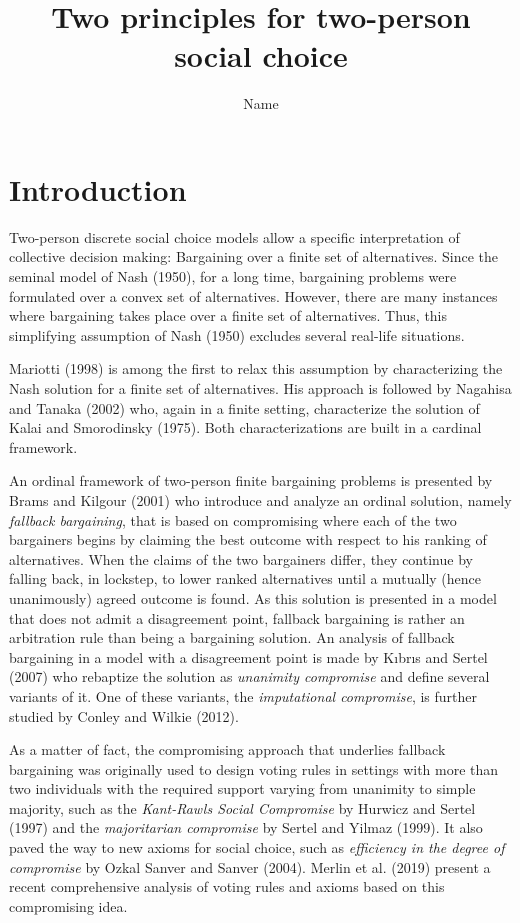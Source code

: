 \documentclass[version=3.21, pagesize, twoside=off, bibliography=totoc, DIV=calc, fontsize=12pt, a4paper]{scrartcl}
\title{Two principles for two-person social choice}
\author{Name}
\affil{Université Paris-Dauphine, PSL Research University, CNRS, LAMSADE, 75016 PARIS, FRANCE\\
}
\begin{document}
\maketitle

\section{Introduction}
\label{sec:intro}


Two-person discrete social choice models allow a specific interpretation of collective decision making: Bargaining over a finite set of alternatives. Since the seminal model of Nash (1950), for a long time, bargaining problems were formulated over a convex set of alternatives. However, there are many instances where bargaining takes place over a finite set of alternatives. Thus, this simplifying assumption of Nash (1950) excludes several real-life situations. 

Mariotti (1998) is among the first to relax this assumption by characterizing the Nash solution for a finite set of alternatives. His approach is followed by Nagahisa and Tanaka (2002) who, again in a finite setting, characterize the solution of Kalai and Smorodinsky (1975). Both characterizations are built in a cardinal framework. 
 
An ordinal framework of two-person finite bargaining problems is presented by Brams and Kilgour (2001) who introduce and analyze an ordinal solution, namely \textit{fallback bargaining}, that is based on compromising where each of the two bargainers begins by claiming the best outcome with respect to his ranking of alternatives. When the claims of the two bargainers differ, they continue by falling back, in lockstep, to lower ranked alternatives until a mutually (hence unanimously) agreed outcome is found. As this solution is presented in a model that does not admit a disagreement point, fallback bargaining is rather an arbitration rule than being a bargaining solution. An analysis of fallback bargaining in a model with a disagreement point is made by Kıbrıs and Sertel (2007) who rebaptize the solution as \textit{unanimity compromise} and define several variants of it. One of these variants, the \textit{imputational compromise}, is further studied by Conley and Wilkie (2012).
 
As a matter of fact, the compromising approach that underlies fallback bargaining was originally used to design voting rules in settings with more than two individuals with the required support varying from unanimity to simple majority, such as the \textit{Kant-Rawls Social Compromise} by Hurwicz and Sertel (1997) and the \textit{majoritarian compromise} by Sertel and Yilmaz (1999). It also paved the way to new axioms for social choice, such as \textit{efficiency in the degree of compromise} by Ozkal Sanver and Sanver (2004).  Merlin et al. (2019) present a recent comprehensive analysis of voting rules and axioms based on this compromising idea.
 
\end{document}
